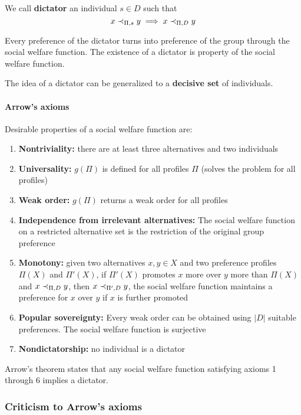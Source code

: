 We call \textbf{dictator} an individual $s \in D$ such that 
$$ x \prec_{\Pi, s} y \implies x \prec_{\Pi, D} y$$

Every preference of the dictator turns into preference of the group through the social welfare function. The existence of a dictator is property of the social welfare function.

The idea of a dictator can be generalized to a \textbf{decisive set} of individuals.

\paragraph{Arrow's axioms} Desirable properties of a social welfare function are: 
\begin{enumerate}
	\item \textbf{Nontriviality:} there are at least three alternatives and two individuals 
	
	\item \textbf{Universality:} $g(\Pi)$ is defined for all profiles $\Pi$ (solves the problem for all profiles)
	
	\item \textbf{Weak order:} $g(\Pi)$ returns a weak order for all profiles
	
	\item \textbf{Independence from irrelevant alternatives:} The social welfare function on a restricted alternative set is the restriction of the original group preference
	
	\item \textbf{Monotony:} given two alternatives $x,y \in X$ and two preference profiles $\Pi(X)$ and $\Pi'(X)$, if $\Pi'(X)$ promotes $x$ more over $y$ more than $\Pi(X)$ and $x \prec_{\Pi, D} y$, then $x \prec_{\Pi', D} y$, the social welfare function maintains a preference for $x$ over $y$ if $x$ is further promoted
	
	\item \textbf{Popular sovereignty:} Every weak order can be obtained using $|D|$ suitable preferences. The social welfare function is surjective
	
	\item \textbf{Nondictatorship:} no individual is a dictator
\end{enumerate}

Arrow's theorem states that any social welfare function satisfying axioms 1 through 6 implies a dictator.

\subsubsection{Criticism to Arrow's axioms}

